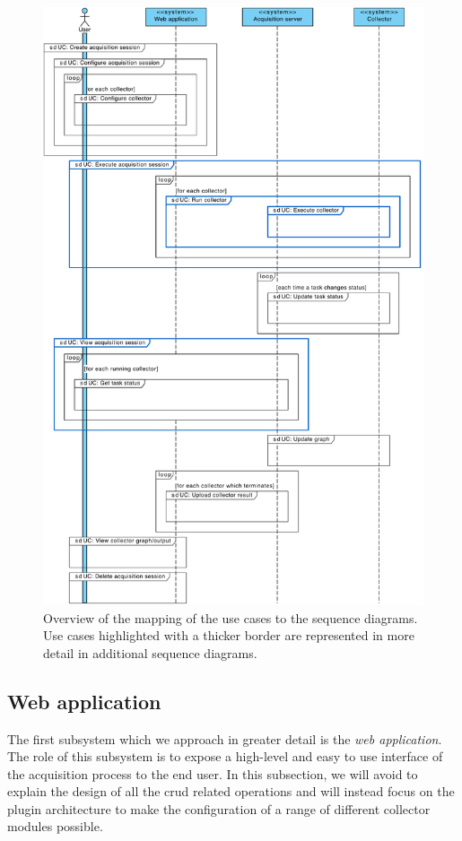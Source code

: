 \begin{figure}
  \centering
  \includegraphics[width=0.95\linewidth]{images/diagrams/seq-overview}
  \caption[Overview of the mapping of the use cases to the sequence diagrams.]{Overview of the mapping of the use cases to the sequence diagrams. Use cases highlighted with a thicker border are represented in more detail in additional sequence diagrams.}
  \label{fig:seq-overview}
\end{figure}


\subsection{Web application}

The first subsystem which we approach in greater detail is the \emph{web application}. The role of this subsystem is to expose a high-level and easy to use interface of the acquisition process to the end user. In this subsection, we will avoid to explain the design of all the \gls{crud} related operations and will instead focus on the plugin architecture to make the configuration of a range of different collector modules possible.

